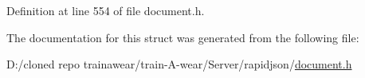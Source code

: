 Definition at line 554 of file document.\+h.


\begin{DoxyCode}{0}

\end{DoxyCode}


The documentation for this struct was generated from the following file\+:\begin{DoxyCompactItemize}
\item 
D\+:/cloned repo trainawear/train-\/\+A-\/wear/\+Server/rapidjson/\mbox{\hyperlink{document_8h}{document.\+h}}\end{DoxyCompactItemize}
